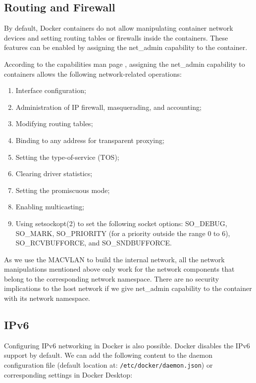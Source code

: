 \documentclass[article]{aaltoseries}
\begin{document}
\subsection{Routing and Firewall}

By default, Docker containers do not allow manipulating container network devices and setting routing tables or firewalls inside the containers. These features can be enabled by assigning the net\_admin capability to the container.

According to the capabilities man page \cite{capabilities}, assigning the net\_admin capability to containers allows the following network-related operations:
\begin{enumerate}
\setlength{\itemsep}{0pt}
\setlength{\parsep}{0pt}
\setlength{\parskip}{0pt}
\item Interface configuration;
\item Administration of IP firewall, masquerading, and accounting;
\item Modifying routing tables;
\item Binding to any address for transparent proxying;
\item Setting the type-of-service (TOS);
\item Clearing driver statistics;
\item Setting the promiscuous mode;
\item Enabling multicasting;
\item Using setsockopt(2) to set the following socket options:
SO\_DEBUG, SO\_MARK, SO\_PRIORITY (for a priority outside the
range 0 to 6), SO\_RCVBUFFORCE, and SO\_SNDBUFFORCE.
\end{enumerate}

As we use the MACVLAN to build the internal network, all the network manipulations mentioned above only work for the network components that belong to the corresponding network namespace. There are no security implications to the host network if we give net\_admin capability to the container with its network namespace.

\subsection{IPv6}
Configuring IPv6 networking in Docker \cite{docker_documentation_ipv6_2023} is also possible. Docker disables the IPv6 support by default. We can add the following content to the daemon configuration file (default location at: \texttt{/etc/docker/daemon.json}) or corresponding settings in Docker Desktop:
\end{document}
